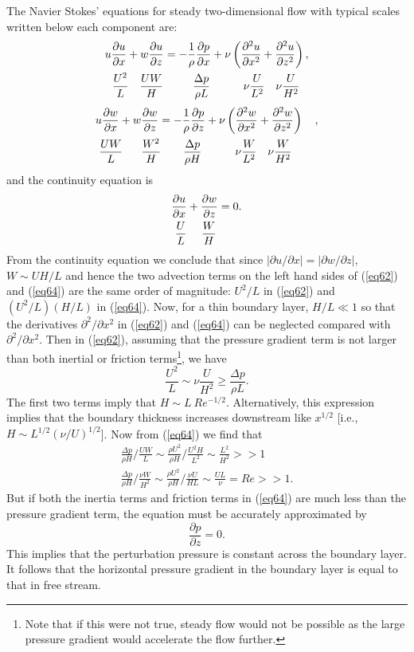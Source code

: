 \documentclass[twoside,a4paper,11pt]{report}
\begin{document}
The Navier Stokes' equations for steady two-dimensional flow with typical 
scales written below each component are:
\begin{align}
& u\frac{\partial u}{\partial x}+w\frac{\partial u}{\partial 
z}=-\frac{1}{\rho }\frac{\partial p}{\partial x}+\nu 
\left( {\frac{\partial ^2u}{\partial x^2}+\frac{\partial 
^2u}{\partial z^2}} \right), \label{eq62} \\
& \ \  \frac{U^2}{L}
\quad 
\frac{UW}{H}
\ \ \qquad
\frac{\Delta p}{\rho L}
\quad \qquad
\nu \frac{U}{L^2}
\quad
\nu \frac{U}{H^2} \notag
\end{align}
\begin{align}
& u\frac{\partial w}{\partial x}+w\frac{\partial w}{\partial 
z}=-\frac{1}{\rho }\frac{\partial p}{\partial z}+\nu 
\left( {\frac{\partial ^2w}{\partial x^2}+\frac{\partial 
^2w}{\partial z^2}} \right)\quad , \label{eq64} \\
&\  \frac{UW}{L}
\ \ \quad
\frac{W^2}{H}
\qquad
\frac{\Delta p}{\rho H}
\qquad \quad
\nu \frac{W}{L^2}
\quad
\nu \frac{W}{H^2} \notag
\end{align}
and the continuity equation is
\begin{align}
& \frac{\partial u}{\partial x}+\frac{\partial w}{\partial 
z}=0. \label{eq66} \\
& \ \frac{U}{L}
\ \quad
\frac{W}{H} \notag
\end{align}
From the continuity equation we conclude that since $\left| {{\partial u} 
/ {\partial x}} \right|=\left| {{\partial w} 
/ {\partial z}} \right|$, $W \sim UH/L$ and hence 
the two advection terms on the left hand sides of (\ref{eq62}) and (\ref{eq64}) are the 
same order of magnitude: $U^{2}/L$ in (\ref{eq62}) and $(U^{2}/L) (H/L)$ in 
(\ref{eq64}). Now, for a thin boundary layer, $H/L \ll 1$ so that the derivatives 
$\partial ^{2}/\partial x^{2 }$ in (\ref{eq62}) and (\ref{eq64}) can be neglected 
compared with $\partial ^{2}/\partial x^{2 }$. Then in (\ref{eq62}), assuming 
that the pressure gradient term is not larger than both inertial or friction 
terms\footnote{ Note that if this were not true, steady flow would not be 
possible as the large pressure gradient would accelerate the flow further.}, 
we have
\[
\frac{U^2}{L}\sim \nu \frac{U}{H^2}\ge \frac{\Delta p}{\rho L}.
\]
The first two terms imply that $H \sim L\ Re^{-1/2}$. Alternatively, this 
expression implies that the boundary thickness increases downstream like 
$x^{1/2}$ [i.e., $H \sim L^{1/2} (\nu /U)^{1/2}$]. Now from (\ref{eq64}) we 
find that
\begin{gather*}
{\frac{\Delta p}{\rho H}} / {\frac{UW}{L}}\sim 
{\frac{\rho U^2}{\rho H}} / 
{\frac{U^2H}{L^2}}\sim \frac{L^2}{H^2}>>1 \\
{\frac{\Delta p}{\rho H}} / {\frac{\nu 
W}{H^2}}\sim {\frac{\rho U^2}{\rho H}} /{\frac{\nu U}{HL}}\sim \frac{UL}{\nu }=Re>>1.
\end{gather*}
But if both the inertia terms and friction terms in (\ref{eq64}) are much less than 
the pressure gradient term, the equation must be accurately approximated by
\[
\frac{\partial p}{\partial z}=0.
\]
This implies that the perturbation pressure is constant across the boundary 
layer. It follows that the horizontal pressure gradient in the boundary 
layer is equal to that in free stream.
\end{document}
